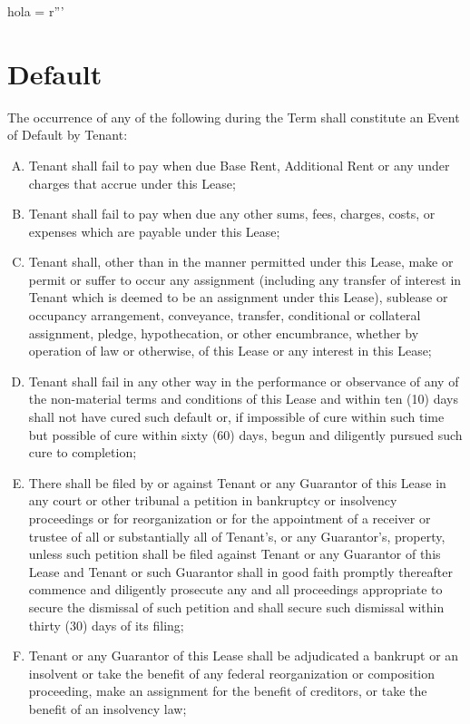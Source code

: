 hola = r'''\documentclass{article}
\begin{document}
\section{Default}
    The occurrence of any of the following during the Term shall constitute an Event of Default by Tenant:
    \begin{enumerate}[(A)]

    \item Tenant shall fail to pay when due Base Rent, Additional Rent or any under charges that accrue under this Lease;

    \item Tenant shall fail to pay when due any other sums, fees, charges, costs, or expenses which are payable under this Lease;

    \item	Tenant shall, other than in the manner permitted under this Lease, make or permit or suffer to occur any assignment (including any transfer of interest in Tenant which is deemed to be an assignment under this Lease), sublease or occupancy arrangement, conveyance, transfer, conditional or collateral assignment, pledge, hypothecation, or other encumbrance, whether by operation of law or otherwise, of this Lease or any interest in this Lease;

    \item	Tenant shall fail in any other way in the performance or observance of any of the non-material terms and conditions of this Lease and within ten (10) days shall not have cured such default or, if impossible of cure within such time but possible of cure within sixty (60) days, begun and diligently pursued such cure to completion;

    \item	There shall be filed by or against Tenant or any Guarantor of this Lease in any court or other tribunal a petition in bankruptcy or insolvency proceedings or for reorganization or for the appointment of a receiver or trustee of all or substantially all of Tenant's, or any Guarantor's, property, unless such petition shall be filed against Tenant or any Guarantor of this Lease and Tenant or such Guarantor shall in good faith promptly thereafter commence and diligently prosecute any and all proceedings appropriate to secure the dismissal of such petition and shall secure such dismissal within thirty (30) days of its filing;

    \item	Tenant or any Guarantor of this Lease shall be adjudicated a bankrupt or an insolvent or take the benefit of any federal reorganization or composition proceeding, make an assignment for the benefit of creditors, or take the benefit of an insolvency law;


\end{enumerate}
\end{document}
